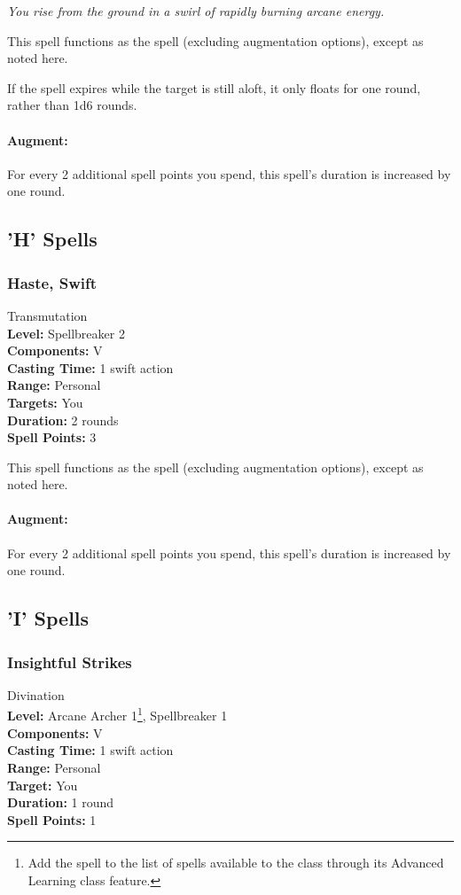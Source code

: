 \emph{You rise from the ground in a swirl of rapidly burning arcane energy.}

This spell functions as the  spell (excluding augmentation options), except as noted here.

If the spell expires while the target is still aloft, it only floats for one round, rather than 1d6 rounds.

\paragraph{Augment:} For every 2 additional spell points you spend, this spell's duration is increased by one round.
\subsection{'H' Spells}
\subsubsection[Swift Haste]{Haste, Swift}
\label{Spell:SwiftHaste}
Transmutation
\\ \textbf{Level:} Spellbreaker 2
\\ \textbf{Components:} V
\\ \textbf{Casting Time:} 1 swift action
\\ \textbf{Range:} Personal
\\ \textbf{Targets:} You
\\ \textbf{Duration:} 2 rounds
\\ \textbf{Spell Points:} 3

This spell functions as the  spell (excluding augmentation options), except as noted here.

\paragraph{Augment:} For every 2 additional spell points you spend, this spell's duration is increased by one round.
\subsection{'I' Spells}
\subsubsection{Insightful Strikes}
\label{Spell:InsightfulStrikes}
Divination
\\ \textbf{Level:} Arcane Archer 1\footnote{Add the spell to the list of spells available to the class through its Advanced Learning class feature.}, Spellbreaker 1
\\ \textbf{Components:} V
\\ \textbf{Casting Time:} 1 swift action
\\ \textbf{Range:} Personal
\\ \textbf{Target:} You
\\ \textbf{Duration:} 1 round
\\ \textbf{Spell Points:} 1


